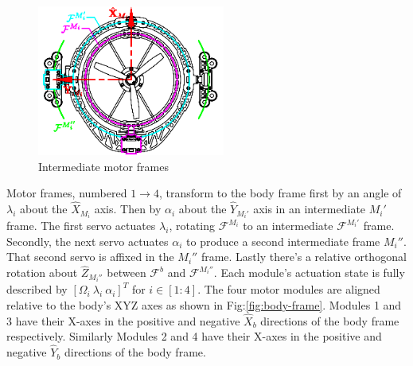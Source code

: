 \begin{minipage}{\textwidth}
\begin{figure}
\centering
\includegraphics[width=0.55\textwidth]{figs/motor-frame}
\caption{Intermediate motor frames}
\label{fig:motor-frame}
\end{figure}
\par
Motor frames, numbered $1\rightarrow 4$, transform to the body frame first by an angle of $\lambda_i$ about the $\hat{X}_{M_i}$ axis. Then by $\alpha_i$ about the $\hat{Y}_{M_i'}$ axis in an intermediate $M_i'$ frame. The first servo actuates $\lambda_i$, rotating $\mathcal{F}^{M_i}$ to an intermediate $\mathcal{F}^{M_i'}$ frame. Secondly, the next servo actuates $\alpha_i$ to produce a second intermediate frame $M_i''$. That second servo is affixed in the $M_i''$ frame. Lastly there's a relative orthogonal rotation about $\hat{Z}_{M_i''}$ between $\mathcal{F}^b$ and $\mathcal{F}^{M_i''}$. Each module's actuation state is fully described by $[\Omega_{i}~\lambda_{i}~\alpha_{i}]^{T}$ for $i\in [1:4]$. The four motor modules are aligned relative to the body's XYZ axes as shown in Fig:\ref{fig:body-frame}. Modules 1 and 3 have their X-axes in the positive and negative $\hat{X}_b$ directions of the body frame respectively. Similarly Modules 2 and 4 have their X-axes in the positive and negative $\hat{Y}_b$ directions of the body frame.
\end{minipage}
\newpage
